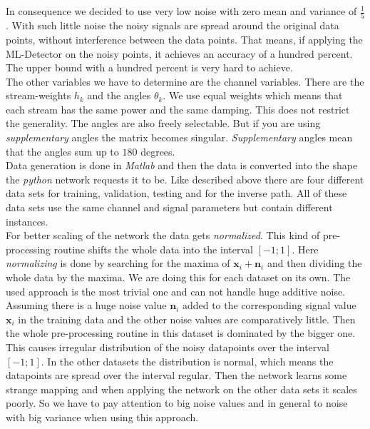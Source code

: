 \documentclass[oneside]{msvreport}%
\newcommand{\B}[1]{\boldsymbol{#1}}
\newcommand{\e}[1]{\emph{#1}}
\begin{document}
In consequence we decided to use very low noise with zero mean and variance of $\frac{1}{5}$. With such little noise the noisy signals are spread around the original data points, without interference between the data points. That means, if applying the ML-Detector on the noisy points, it achieves an accuracy of a hundred percent. The upper bound with a hundred percent is very hard to achieve. \\
The other variables we have to determine are the channel variables. There are the stream-weights $h_k$ and the angles $\theta_k$. We use equal weights which means that each stream has the same power and the same damping. This does not restrict the generality. The angles are also freely selectable. But if you are using \e{supplementary} angles the matrix becomes singular. \e{Supplementary} angles mean that the angles sum up to $180$ degrees. \\
Data generation is done in \e{Matlab} and then the data is converted into the shape the \e{python} network requests it to be. Like described above there are four different data sets for training, validation, testing and for the inverse path. All of these data sets use the same channel and signal parameters but contain different instances.\\
For better scaling of the network the data gets \e{normalized}. This kind of pre-processing routine shifts the whole data into the interval $[-1; 1]$. Here \e{normalizing} is done by searching for the maxima of $\B{x}_i + \B{n}_i$ and then dividing the whole data by the maxima. We are doing this for each dataset on its own. The used approach is the most trivial one and can not handle huge additive noise. Assuming there is a huge noise value $\B{n}_i$ added to the corresponding signal value $\B{x}_i$ in the training data and the other noise values are comparatively little. Then the whole pre-processing routine in this dataset is dominated by the bigger one. This causes irregular distribution of the noisy datapoints over the interval $[-1; 1]$. In the other datasets the distribution is normal, which means the datapoints are spread over the interval regular. Then the network learns some strange mapping and when applying the network on the other data sets it scales poorly. So we have to pay attention to big noise values and in general to noise with big variance when using this approach.\\
\end{document}
